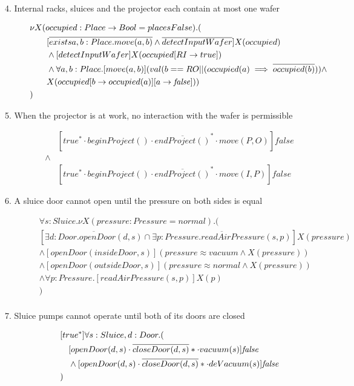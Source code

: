 \begin{description}
\cbstart
 \item[4. Internal racks, sluices and the projector each contain at most one wafer]
\begin{align*}
& \nu X(occupied:Place \to Bool=placesFalse).(\\
& \tab\tab [\overline{exists a,b:Place.move(a,b)} \wedge \overline{detectInputWafer}]X(occupied) \\
& \tab\tab \wedge [detectInputWafer]X(occupied[RI \to true]) \\
& \tab\tab \wedge \forall a,b:Place.[move(a,b)](val(b==RO || (occupied(a) \implies \overline{occupied(b)})) \wedge \\
& \tab\tab X(occupied[b \to occupied(a)][a \to \mathit{false}])) \\
& )
\end{align*}

 
 \item[5. When the projector is at work, no interaction with the wafer is permissible]
 	\begin{align*}
 		&[true^* \cdot beginProject() \cdot \overline{endProject()}^* \cdot move(P,O)]\mathit{false}\\
 		\wedge\\
 		&[true^* \cdot beginProject() \cdot \overline{endProject()}^* \cdot move(I,P)]\mathit{false}
	\end{align*}
	
 \item[6. A sluice door cannot open until the pressure on both sides is equal]
	\begin{align*}
& \forall s: Sluice . \nu X(pressure: Pressure = normal) . ( \\
&   [\overline{\exists d: Door . openDoor(d, s)} \cap \overline{\exists p: Pressure . readAirPressure(s, p)}]X(pressure) \\
&   \wedge [openDoor(insideDoor, s)](pressure \approx vacuum \wedge X(pressure)) \\
&   \wedge [openDoor(outsideDoor, s)](pressure \approx normal \wedge X(pressure)) \\
&   \wedge \forall p: Pressure . [readAirPressure(s, p)]X(p) \\
& ) \\
	\end{align*}
\cbend

 \item[7. Sluice pumps cannot operate until both of its doors are closed]
 
 \begin{align*}
 &[true^*]\forall s:Sluice, d:Door . ( \\
 &\hspace{1em} [openDoor(d,s)\cdot\overline{closeDoor(d,s)}*\cdot vacuum(s)]\mathit{false} \\
 &\hspace{1em} \wedge [openDoor(d,s)\cdot\overline{closeDoor(d,s)}*\cdot deVacuum(s)]\mathit{false} \\
 &)
 \end{align*}


\end{description}
